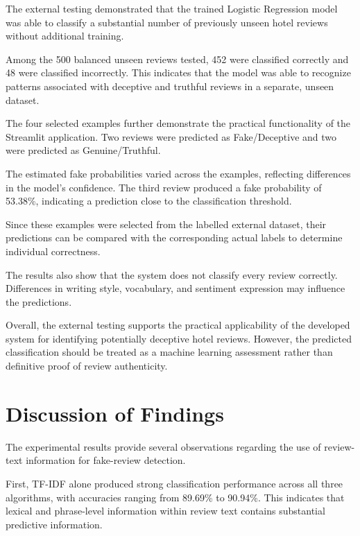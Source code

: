 \documentclass[12pt,a4paper]{report}
\begin{document}
The external testing demonstrated that the
trained Logistic Regression model was able to
classify a substantial number of previously
unseen hotel reviews without additional training.

Among the 500 balanced unseen reviews tested,
452 were classified correctly and 48 were
classified incorrectly. This indicates that
the model was able to recognize patterns
associated with deceptive and truthful reviews
in a separate, unseen dataset.

The four selected examples further demonstrate
the practical functionality of the Streamlit
application. Two reviews were predicted as
Fake/Deceptive and two were predicted as
Genuine/Truthful.

The estimated fake probabilities varied across
the examples, reflecting differences in the
model's confidence. The third review produced
a fake probability of 53.38\%, indicating
a prediction close to the classification
threshold.

Since these examples were selected from the
labelled external dataset, their predictions
can be compared with the corresponding actual
labels to determine individual correctness.

The results also show that the system does not
classify every review correctly. Differences
in writing style, vocabulary, and sentiment
expression may influence the predictions.

Overall, the external testing supports the
practical applicability of the developed
system for identifying potentially deceptive
hotel reviews. However, the predicted
classification should be treated as a
machine learning assessment rather than
definitive proof of review authenticity.


\section{Discussion of Findings}

The experimental results provide several observations regarding the
use of review-text information for fake-review detection.

First, TF-IDF alone produced strong classification performance across
all three algorithms, with accuracies ranging from 89.69\% to 90.94\%.
This indicates that lexical and phrase-level information within review
text contains substantial predictive information.
\end{document}
